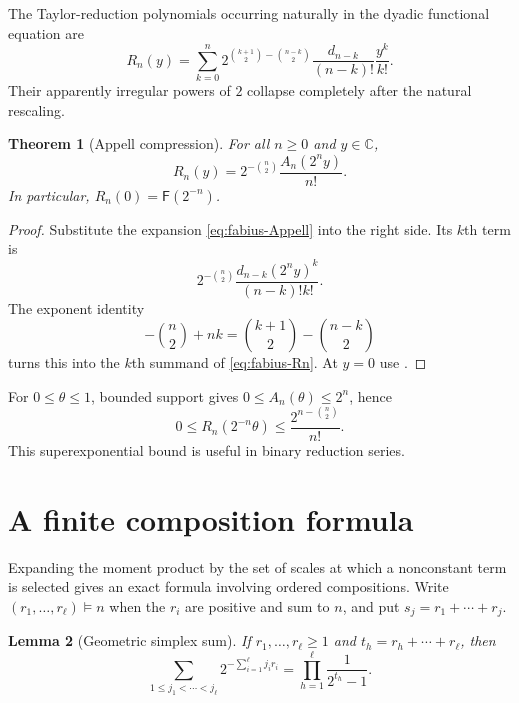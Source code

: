 \documentclass[11pt,oneside,openany]{book}
\newtheorem{theorem}{Theorem}[chapter]
\newtheorem{lemma}[theorem]{Lemma}
\theoremstyle{definition}
\theoremstyle{remark}
\newcommand{\C}{\mathbb C}
\newcommand{\Fab}{\mathsf F}
\begin{document}
The Taylor-reduction polynomials occurring naturally in the dyadic functional
equation are
\begin{equation}\label{eq:fabius-Rn}
 R_n(y)=\sum_{k=0}^n
 2^{\binom{k+1}{2}-\binom{n-k}{2}}
 \frac{d_{n-k}}{(n-k)!}\frac{y^k}{k!}.
\end{equation}
Their apparently irregular powers of $2$ collapse completely after the
natural rescaling.

\begin{theorem}[Appell compression]\label{thm:fabius-Appell-compression}
For all $n\ge0$ and $y\in\C$,
\begin{equation}\label{eq:fabius-Appell-compression}
 \boxed{R_n(y)=2^{-\binom n2}\frac{A_n(2^ny)}{n!}.}
\end{equation}
In particular, $R_n(0)=\Fab(2^{-n})$.
\end{theorem}

\begin{proof}
Substitute the expansion \eqref{eq:fabius-Appell} into the right side.  Its
$k$th term is
\[
 2^{-\binom n2}\frac{d_{n-k}(2^ny)^k}{(n-k)!k!}.
\]
The exponent identity
\[
 -\binom n2+nk
 =\binom{k+1}{2}-\binom{n-k}{2}
\]
turns this into the $k$th summand of \eqref{eq:fabius-Rn}.  At $y=0$ use
.
\end{proof}

For $0\le\theta\le1$, bounded support gives
$0\le A_n(\theta)\le2^n$, hence
\begin{equation}\label{eq:fabius-Rn-bound}
 0\le R_n(2^{-n}\theta)
 \le\frac{2^{n-\binom n2}}{n!}.
\end{equation}
This superexponential bound is useful in binary reduction series.

\section{A finite composition formula}

Expanding the moment product by the set of scales at which a nonconstant term
is selected gives an exact formula involving ordered compositions.  Write
$(r_1,\ldots,r_\ell)\vDash n$ when the $r_i$ are positive and sum to $n$, and
put $s_j=r_1+\cdots+r_j$.

\begin{lemma}[Geometric simplex sum]\label{lem:fabius-geometric-simplex}
If $r_1,\ldots,r_\ell\ge1$ and
$t_h=r_h+\cdots+r_\ell$, then
\begin{equation}\label{eq:fabius-geometric-simplex}
 \sum_{1\le j_1<\cdots<j_\ell}
 2^{-\sum_{i=1}^\ell j_ir_i}
 =\prod_{h=1}^\ell\frac1{2^{t_h}-1}.
\end{equation}
\end{lemma}
\end{document}
